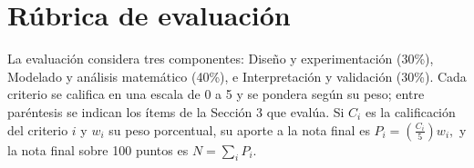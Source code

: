 \documentclass[oneside,letter,spanish,activeacute,english,links,10pt]{amcaGCS_EDO}
\begin{document}

%
	
%


\section{Rúbrica de evaluación}

La evaluación considera tres componentes: Diseño y experimentación (30\%), Modelado y análisis matemático (40\%), e Interpretación y validación (30\%). Cada criterio se califica en una escala de 0 a 5 y se pondera según su peso; entre paréntesis se indican los ítems de la Sección 3 que evalúa. Si $C_i$ es la calificación del criterio $i$ y $w_i$ su peso porcentual, su aporte a la nota final es
$P_i=\left(\frac{C_i}{5}\right)w_i ,
$ y la nota final sobre 100 puntos es $N=\sum_i P_i$.
\end{document}
